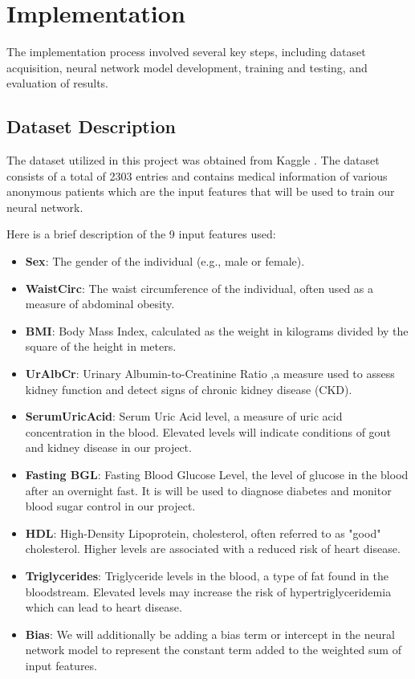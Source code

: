\section{Implementation}
The implementation process involved several key steps, including dataset acquisition, neural network model development, training and testing, and evaluation of results.

\subsection{Dataset Description}
The dataset utilized in this project was obtained from Kaggle \cite{metabolic_syndrome}. The dataset consists of a total of 2303 entries and contains medical information of various anonymous patients which are the input features that will be used to train our neural network.

Here is a brief description of the 9 input features used:

\begin{itemize}
    \item \textbf{Sex}: The gender of the individual (e.g., male or female).
    
    \item \textbf{WaistCirc}: The waist circumference of the individual, often used as a measure of abdominal obesity.
    
    \item \textbf{BMI}: Body Mass Index, calculated as the weight in kilograms divided by the square of the height in meters.
    
    \item \textbf{UrAlbCr}: Urinary Albumin-to-Creatinine Ratio ,a measure used to assess kidney function and detect signs of chronic kidney disease (CKD).
    
    \item \textbf{SerumUricAcid}: Serum Uric Acid level, a measure of uric acid concentration in the blood. Elevated levels will indicate conditions of gout and kidney disease in our project.
    
    \item \textbf{Fasting BGL}: Fasting Blood Glucose Level, the level of glucose in the blood after an overnight fast. It is will be used to diagnose diabetes and monitor blood sugar control in our project.
    
    \item \textbf{HDL}: High-Density Lipoprotein, cholesterol, often referred to as "good" cholesterol. Higher levels are associated with a reduced risk of heart disease.
    
    \item \textbf{Triglycerides}: Triglyceride levels in the blood, a type of fat found in the bloodstream. Elevated levels may increase the risk of hypertriglyceridemia which can lead to heart disease.
    
    \item \textbf{Bias}: We will additionally be adding a bias term or intercept in the neural network model to represent the constant term added to the weighted sum of input features.
\end{itemize}

